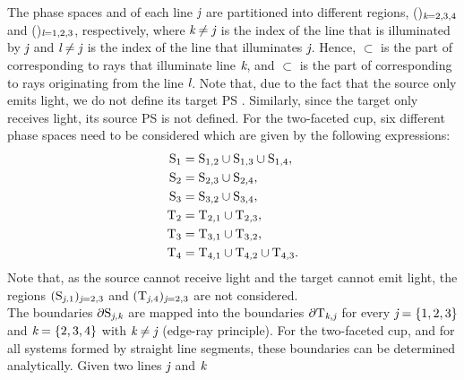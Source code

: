 The phase spaces  and   of each line $\textit{j}$ are partitioned into different regions, ()$_{\textit{k}=2, 3, 4}$ and ()$_{\textit{l}=1, 2, 3}$, respectively, where $\textit{k}\neq \textit{j}$ is the index of the line that is illuminated by $\textit{j}$ and $\textit{l}\neq\textit{j}$ is the index of the line that illuminates $\textit{j}$. Hence, $\subset$  is the part of  corresponding to rays that illuminate line $\textit{k}$, and  $\subset$  is the part of  corresponding to rays originating from the line $\textit{l}$. Note that, due to the fact that the source only emits light, we do not define its target PS . Similarly, since the target only receives light, its source PS  is not defined.
For the two-faceted cup, six different phase spaces need to be considered which are given by the following expressions:
\begin{equation}
\label{SPS}
\begin{split}
 \mbox{$\textup{S}_{\textit{$1$}}$} & = \mbox{$\textup{S}_{\textit{$1$,$2$}}$}\cup
 \mbox{$\textup{S}_{\textit{$1$,$3$}}$} \cup \mbox{$\textup{S}_{\textit{$1$,$4$}}$},\\
\mbox{$\textup{S}_{\textit{$2$}}$} & =  \mbox{$\textup{S}_{\textit{$2$,$3$}}$} \cup \mbox{$\textup{S}_{\textit{$2$,$4$}}$},\\
\mbox{$\textup{S}_{\textit{$3$}}$} & =  \mbox{$\textup{S}_{\textit{$3$,$2$}}$} \cup \mbox{$\textup{S}_{\textit{$3$,$4$}}$},\\
\mbox{$\textup{T}_{\textit{$2$}}$} & = \mbox{$\textup{T}_{\textit{$2$,$1$}}$} \cup \mbox{$\textup{T}_{\textit{$2$,$3$}}$},\\
\mbox{$\textup{T}_{\textit{$3$}}$} & = \mbox{$\textup{T}_{\textit{$3$,$1$}}$}\cup \mbox{$\textup{T}_{\textit{$3$,$2$}}$},\\
\mbox{$\textup{T}_{\textit{$4$}}$} & = \mbox{$\textup{T}_{\textit{$4$,$1$}}$}\cup \mbox{$\textup{T}_{\textit{$4$,$2$}}$}\cup
\mbox{$\textup{T}_{\textit{$4$,$3$}}$}.
\end{split}
 \end{equation}
Note that, as the source cannot receive light and the target cannot emit light,  the regions $(\mbox{$\textup{S}_{\textit{\textit{j},$1$}}$})_{\textit{j}=2,3}$ and $(\mbox{$\textup{T}_{\textit{\textit{j},$4$}}$})_{\textit{j}=2, 3}$ are not considered. 
\\ \indent The boundaries $\partial \mbox{$\textup{S}_{\textit{\textit{j},\textit{k}}}$}$ are mapped into the boundaries $\partial \mbox{$\textup{T}_{\textit{\textit{k},\textit{j}}}$}$ for every $\textit{j}=\{1, 2, 3\}$ 
and $\textit{k}=\{2, 3,4\}$ with $\textit{k}\neq \textit{j}$ (edge-ray principle). For the two-faceted cup, and for all systems formed by straight line segments, these boundaries can be determined analytically. Given two lines $\textit{j}$ and $\textit{k}$
